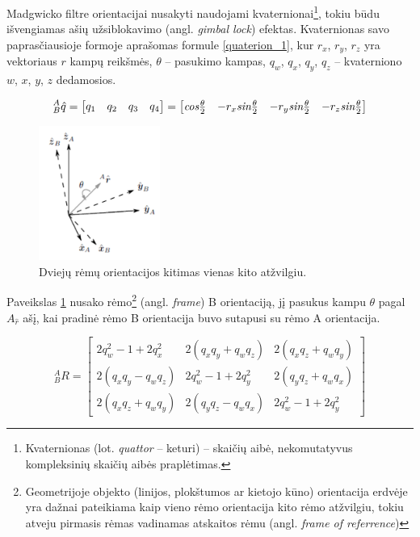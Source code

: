 \documentclass[]{vgtuef}
\begin{document}
Madgwicko filtre orientacijai nusakyti naudojami kvaternionai\footnote{Kvaternionas (lot. \textit{quattor} – keturi) – skaičių aibė, nekomutatyvus kompleksinių skaičių aibės praplėtimas. }, tokiu būdu išvengiamas ašių užsiblokavimo (angl. \textit{gimbal lock}) efektas. Kvaternionas savo paprasčiausioje formoje aprašomas formule \ref{quaterion_1}, kur $r_{x}$, $r_{y}$, $r_{z}$ yra vektoriaus $r$ kampų reikšmės, $\theta$ – pasukimo kampas, $q_{w}$, $q_{x}$, $q_{y}$, $q_{z}$ – kvaterniono $w$, $x$, $y$, $z$ dedamosios. 

\begin{equation}
_{B}^{A}\hat{q}= \begin{bmatrix} q_{1} & q_{2} & q_{3} & q_{4}
\end{bmatrix} = \begin{bmatrix}
\emph{cos}\frac{\theta}{2} & -r_{x}\emph{sin}\frac{\theta}{2} & -r_{y}\emph{sin}\frac{\theta}{2} & -r_{z}\emph{sin}\frac{\theta}{2}
\end{bmatrix}
\label{quaterion_1}
\end{equation}

\begin{figure}[!h]
  \centering
  \includegraphics[width=150px]{img/quaternion_frame.png}
  \caption{Dviejų rėmų orientacijos kitimas vienas kito atžvilgiu.}
  \label{fig:quaternion_2}
\end{figure}

Paveikslas \ref{fig:quaternion_2} nusako rėmo\footnote{Geometrijoje objekto (linijos, plokštumos ar kietojo kūno) orientacija erdvėje yra dažnai pateikiama kaip vieno rėmo orientacija kito rėmo atžvilgiu, tokiu atveju pirmasis rėmas vadinamas atskaitos rėmu (angl. \textit{frame of referrence})} (angl. \textit{frame}) B orientaciją, jį pasukus kampu $\theta$ pagal $A_{\hat{r}}$  ašį, kai pradinė rėmo B orientacija buvo sutapusi su rėmo A orientacija.

\begin{equation}
_{B}^{A}R = \begin{bmatrix} 
   2q_{w}^{2} - 1 + 2q_{x}^{2} & 2(q_{x}q_{y}+q_{w}q_{z}) & 2(q_{x}q_{z}+q_{w}q_{y})
\\ 2(q_{x}q_{y}-q_{w}q_{z}) & 2q_{w}^{2} - 1 + 2q_{y}^{2} & 2(q_{y}q_{z}+q_{w}q_{x})
\\ 2(q_{x}q_{z}+q_{w}q_{y}) & 2(q_{y}q_{z}-q_{w}q_{x}) & 2q_{w}^{2} - 1 + 2q_{y}^{2}
\end{bmatrix}
\label{equ:rotation_matrix}
\end{equation}
\end{document}
